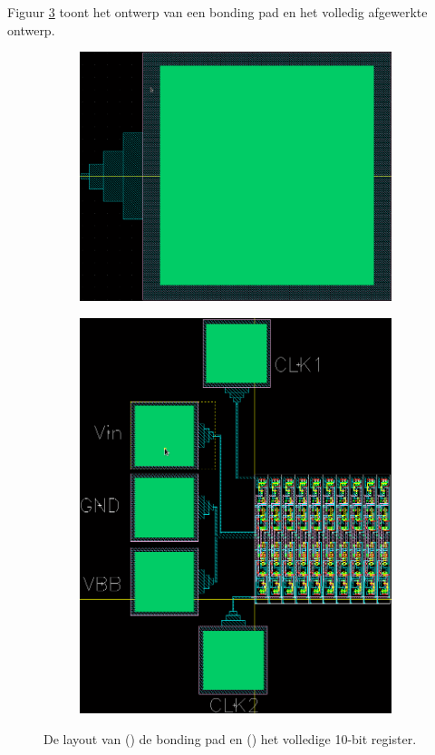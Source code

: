 \documentclass[11pt,a4paper,oneside,dutch]{article}
\begin{document}
Figuur \ref{fig:layout} toont het ontwerp van een bonding pad en het volledig afgewerkte ontwerp.

\begin{figure}
	\centering
	\begin{subfigure}[b]{0.5\textwidth}
		\includegraphics[width=\textwidth]{bonding_pad.png}
		\caption{}
		\label{fig:bonding_pad}
	\end{subfigure}
	\qquad
	\begin{subfigure}[b]{0.4\textwidth}
		\includegraphics[width=\textwidth]{10bit.png}
		\caption{}
		\label{fig:10bit}
	\end{subfigure}
	
	\caption{De layout van () de bonding pad en () het volledige 10-bit register.}
	\label{fig:layout}
\end{figure}
\end{document}
